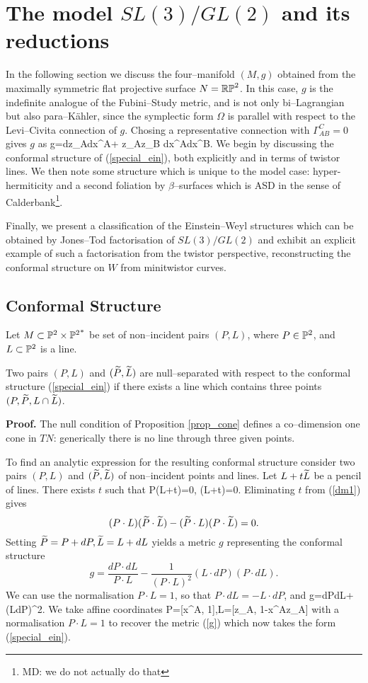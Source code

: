 \section{The model $SL(3)/GL(2)$ and its reductions}
\label{model}
In the following section we discuss the four--manifold $(M,g)$ obtained from the maximally symmetric flat 
projective surface $N=\mathbb{RP}^2$. In this case, $g$ is the indefinite analogue of the Fubini--Study metric, and is not only bi--Lagrangian but also para--K\"ahler, since the symplectic form $\Omega$ is parallel with respect to the Levi--Civita connection of $g$. Chosing a representative connection with
$\Gamma_{AB}^C=0$ gives $g$ as
\be
\label{special_ein}
g=dz_A\odot dx^A+ z_Az_B dx^A\odot dx^B.
\ee
We begin by discussing the  conformal structure
of (\ref{special_ein}), both explicitly and in terms of twistor lines. We then note some structure which is unique to the model case: hyper-hermiticity and a second foliation by $\beta$--surfaces which is ASD in the sense of Calderbank\footnote{MD: we do not actually do that}. 

Finally, we present a classification of the Einstein--Weyl structures which can be obtained by Jones--Tod factorisation of $SL(3)/GL(2)$ and exhibit an explicit example of such a factorisation from the twistor perspective, reconstructing the conformal structure on $W$ from minitwistor curves.
\subsection{Conformal Structure}
\label{model_conf}
Let $M\subset \mathbb{P}^2\times {\mathbb{P}^2}^*$ be set of non--incident pairs 
$(P, L)$, where $P\in \mathbb{P}^2$, and $L\subset \mathbb{P}^2$ is a line. 
\begin{prop}
\label{prop_cone}
Two pairs $(P, L)$ and $(\widetilde{P}, \widetilde{L})$ are null--separated
with respect to the conformal structure (\ref{special_ein})
if there exists
a line which contains three points $(P, \widetilde{P}, L\cap \widetilde{L})$. 
\end{prop}
{\bf Proof.}
The  null condition of Proposition \ref{prop_cone}
defines a co--dimension one cone in $TN$: 
generically there is no line through three given points.

To find an analytic expression for the resulting conformal structure 
consider two pairs  $(P, L)$ and $(\widetilde{P}, \widetilde{L})$ 
of non--incident points and lines. Let $L+t\widetilde{L}$ be a pencil of lines. 
There exists $t$ such that 
\be
\label{dm1}
P\cdot (L+t\tL)=0,  \quad
\tP\cdot (L+t\tL)=0.
\ee 
Eliminating $t$ from 
(\ref{dm1}) gives
\[
(P\cdot L)(\widetilde{P}\cdot \widetilde{L})-(\widetilde{P}\cdot L)(P\cdot \widetilde{L})=0.
\]
Setting $\widetilde{P}=P+dP, \widetilde{L}=L+dL$ yields a metric 
$g$  representing the conformal structure
\[
g=\frac{dP\cdot dL}{P\cdot L}-\frac{1}{(P\cdot L)^2}(L\cdot dP)(P\cdot dL).
\]
We can use the normalisation $P\cdot L=1$, so that $P\cdot dL=-L\cdot dP$,
and
\be
\label{dm_metric}
g={dP\cdot dL}+(L\cdot dP)^2.
\ee
We take affine coordinates 
\be
\label{DM_parameter}
P=[x^A, 1],\quad L=[z_A, 1-x^Az_A]
\ee 
with a normalisation $P\cdot L=1$ to recover the metric (\ref{g}) which now takes the form (\ref{special_ein}).
\koniec
